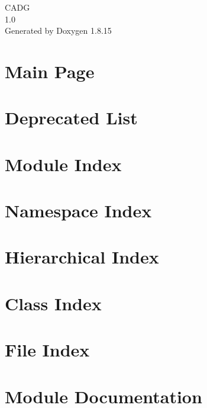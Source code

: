 \let\mypdfximage\pdfximage\def\pdfximage{\immediate\mypdfximage}\documentclass[twoside]{book}
\newcommand{\+}{\discretionary{\mbox{\scriptsize$\hookleftarrow$}}{}{}}
\newcommand{\clearemptydoublepage}{%
  \newpage{\pagestyle{empty}\cleardoublepage}%
}
\begin{document}
\hypersetup{pageanchor=false,
             bookmarksnumbered=true,
             pdfencoding=unicode
            }
\begin{titlepage}
\vspace*{7cm}
\begin{center}%
{\Large C\+A\+DG \\[1ex]\large 1.\+0 }\\
\vspace*{1cm}
{\large Generated by Doxygen 1.8.15}\\
\end{center}
\end{titlepage}
\clearemptydoublepage
{}
\tableofcontents
\clearemptydoublepage
{}
\hypersetup{pageanchor=true}

\chapter{Main Page}
\label{index}\hypertarget{index}{}
\chapter{Deprecated List}
\label{deprecated}

\chapter{Module Index}

\chapter{Namespace Index}

\chapter{Hierarchical Index}

\chapter{Class Index}

\chapter{File Index}

\chapter{Module Documentation}








\end{document}
